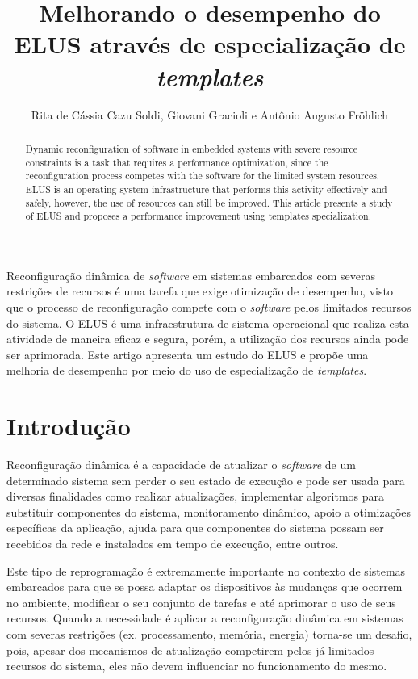\documentclass[12pt]{article}
\title{Melhorando  o desempenho do ELUS através de especialização de \textit{templates}}
\author{Rita de Cássia Cazu Soldi, Giovani Gracioli e Antônio Augusto Fröhlich}
\begin{document}
 

\maketitle
\begin{abstract}
Dynamic reconfiguration of software in embedded systems with severe resource constraints is a task that requires a performance optimization, since the reconfiguration process competes with the software for the limited system resources. ELUS is an operating system infrastructure that performs this activity effectively and safely, however, the use of resources can still be improved. This article presents a study of ELUS and proposes a performance improvement using templates specialization.
\end{abstract}
  
\begin{resumo} 
Reconfiguração dinâmica de \textit{software} em sistemas embarcados com severas restrições de recursos é uma tarefa que exige otimização de desempenho, visto que o processo de reconfiguração compete com o \textit{software} pelos limitados recursos do sistema. O ELUS é uma infraestrutura de sistema operacional que realiza esta atividade de maneira eficaz e segura, porém, a utilização dos recursos ainda pode ser aprimorada. Este artigo apresenta um estudo do ELUS e propõe uma melhoria de desempenho por meio do uso de especialização de \textit{templates}.
\end{resumo}

\section{Introdução}
Reconfiguração dinâmica é a capacidade de atualizar o \textit{software} de um determinado sistema sem perder o seu estado de execução e pode ser usada para diversas finalidades como realizar atualizações, implementar algoritmos para substituir componentes do sistema, monitoramento dinâmico, apoio a otimizações específicas da aplicação, ajuda para que componentes do sistema possam ser recebidos da rede e instalados em tempo de execução, entre outros.

Este tipo de reprogramação é extremamente importante no contexto de sistemas embarcados para que se possa adaptar os dispositivos às mudanças que ocorrem no ambiente, modificar o seu conjunto de tarefas e até aprimorar o uso de seus recursos. Quando a necessidade é aplicar a reconfiguração dinâmica em sistemas com severas restrições (ex. processamento, memória, energia) torna-se um desafio, pois, apesar dos mecanismos de atualização competirem pelos já limitados recursos do sistema, eles não devem influenciar no funcionamento do mesmo.
\end{document}

